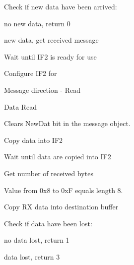 \begin{DoxyItemize}
\item Check if new data have been arrived\+:
\begin{DoxyItemize}
\item no new data, return 0
\item new data, get received message
\end{DoxyItemize}
\item Wait until I\+F2 is ready for use ~\newline
~\newline
~\newline
~\newline
~\newline
~\newline
~\newline

\item Configure I\+F2 for
\begin{DoxyItemize}
\item Message direction -\/ Read
\item Data Read
\item Clears New\+Dat bit in the message object.
\end{DoxyItemize}
\item Copy data into I\+F2 ~\newline
~\newline
~\newline
~\newline
~\newline

\item Wait until data are copied into I\+F2 ~\newline
~\newline
~\newline
~\newline

\item Get number of received bytes
\item Value from 0x8 to 0xF equals length 8.
\item Copy RX data into destination buffer ~\newline
~\newline

\item Check if data have been lost\+:
\begin{DoxyItemize}
\item no data lost, return 1
\item data lost, return 3
\end{DoxyItemize}
\end{DoxyItemize}

